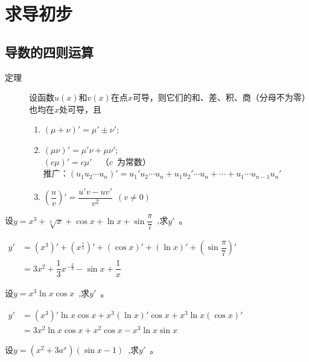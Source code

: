 \section{求导初步}
\subsection{导数的四则运算}
\begin{description}
\item[{\kaishu {}\hspace{2em}\color{cyan}定理}]\hspace{1.5em}设函数$u(x)\text{和}v(x)$在点$x$可导，则它们的和、差、积、商（分母不为零）也均在$x$处可导，且\begin{enumerate}[1)]
\item $(\mu+\nu)'=\mu'\pm \nu'$;
\item $(\mu\nu)'=\mu'\nu+\mu\nu'$;\\$(c\mu)'=c\mu'$~~（$c$~为常数）\\
推广：$(u_1u_2\cdots u_n)'=u_1'u_2 \cdots u_n+u_1u_2'\cdots u_n+\cdots+u_1\cdots u_{n-1}u_n'$
\item $\left(\dfrac{u}{v}\right)'=\dfrac{u'v-uv'}{v^2}~~(v\neq 0)$
\end{enumerate}
\end{description}
\begin{example}
设$y=x^3+\sqrt[3]{x}+\cos x+\ln x+\sin \dfrac{\pi}{7}$~,求$y'$~。
\end{example}
\begin{solution}
$\begin{aligned}
y' &=\left(x^3\right)'+\left(x^{\tfrac{1}{3}}\right)'+\left(\cos x \right)'+\left(\ln x\right)'+\left(\sin \dfrac{\pi}{7}\right)'\\
&=3x^2+\dfrac{1}{3} x^{-\tfrac{2}{3}}-\sin x+\dfrac{1}{x}
\end{aligned}$
\end{solution}
\begin{example}
设$y=x^3\ln x\cos x$~,求$y'$~。
\end{example}
\begin{solution}
$\begin{aligned}
y'&=\left(x^3\right)'\ln x\cos x+x^3\left(\ln x\right)'\cos x+x^3\ln x\left(\cos x\right)'\\
&=3x^2\ln x\cos x+x^2\cos x-x^3\ln x\sin x
\end{aligned}$
\end{solution}
\begin{example}
设$y=\left(x^2+3a^x\right)\left(\sin x-1\right)$~,求$y'$~。
\end{example}
